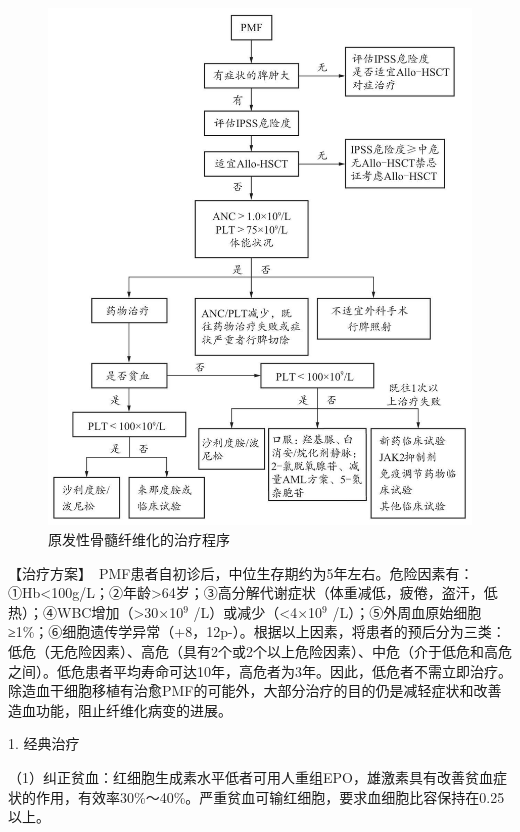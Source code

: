 \begin{figure}[!htbp]
 \centering
 \includegraphics{./images/Image00140.jpg}
 \captionsetup{justification=centering}
 \caption{原发性骨髓纤维化的治疗程序}
 \label{fig5-1-7}
  \end{figure} 

【治疗方案】　PMF患者自初诊后，中位生存期约为5年左右。危险因素有：①Hb<100g/L；②年龄\textgreater{}64岁；③高分解代谢症状（体重减低，疲倦，盗汗，低热）；④WBC增加（\textgreater{}30×10$^{9}$
/L）或减少（<4×10$^{9}$
/L）；⑤外周血原始细胞≥1\%；⑥细胞遗传学异常（+8，12p-）。根据以上因素，将患者的预后分为三类：低危（无危险因素）、高危（具有2个或2个以上危险因素）、中危（介于低危和高危之间）。低危患者平均寿命可达10年，高危者为3年。因此，低危者不需立即治疗。除造血干细胞移植有治愈PMF的可能外，大部分治疗的目的仍是减轻症状和改善造血功能，阻止纤维化病变的进展。

1. 经典治疗

（1）纠正贫血：红细胞生成素水平低者可用人重组EPO，雄激素具有改善贫血症状的作用，有效率30\%～40\%。严重贫血可输红细胞，要求血细胞比容保持在0.25以上。

